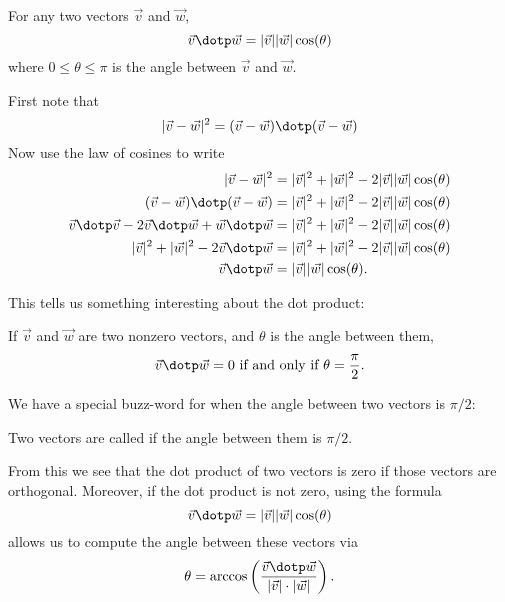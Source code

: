 \documentclass{ximera}
\begin{document}
\begin{theorem}
  For any two vectors $\vec{v}$ and $\vec{w}$,
  \[
  \vec{v} \dotp \vec{w} = |\vec{v}||\vec{w}|\cos(\theta)
  \]
  where $0\le \theta\le\pi$ is the angle between $\vec{v}$ and
  $\vec{w}$.
  \begin{explanation}
    First note that
    \[
    |\vec{v} - \vec{w}|^2 =  (\vec{v} - \vec{w})\dotp(\vec{v} - \vec{w})
    \]
    Now use the law of cosines to write
    \begin{align*}
      |\vec{v} - \vec{w}|^2&=|\vec{v}|^2+|\vec{w}|^2-2|\vec{v}||\vec{w}|\cos(\theta)\\
      (\vec{v} - \vec{w})\dotp(\vec{v} - \vec{w}) &=|\vec{v}|^2+|\vec{w}|^2-2|\vec{v}||\vec{w}|\cos(\theta)\\
      \vec{v}\dotp\vec{v} -2\vec{v}\dotp\vec{w}+\vec{w}\dotp\vec{w}&=|\vec{v}|^2+|\vec{w}|^2-2|\vec{v}||\vec{w}|\cos(\theta)\\
      |\vec{v}|^2+|\vec{w}|^2 -2\vec{v}\dotp\vec{w} &=|\vec{v}|^2+|\vec{w}|^2-2|\vec{v}||\vec{w}|\cos(\theta)\\
      \vec{v} \dotp \vec{w} &= |\vec{v}||\vec{w}|\cos(\theta).
    \end{align*}
  \end{explanation}
\end{theorem}
	
This tells us something interesting about the dot product:

\begin{theorem}
  If $\vec{v}$ and $\vec{w}$ are two nonzero vectors, and $\theta$ is
  the angle between them,
  \[
  \vec{v}\dotp \vec{w} = 0 \text{ if and only if } \theta=
  \frac{\pi}{2}.
  \]
\end{theorem}

We have a special buzz-word for when the angle between two vectors is $\pi/2$:

\begin{definition}
  Two vectors are called  if the angle between them is
  $\pi/2$.
\end{definition}

From this we see that the dot product of two vectors is zero if those
vectors are orthogonal.  Moreover, if the dot product is not zero,
using the formula
\[
\vec{v} \dotp \vec{w} = |\vec{v}||\vec{w}|\cos(\theta)
\]
allows us to compute the angle between these vectors via
\[
\theta = \arccos\left(\frac{\vec{v} \dotp \vec{w} }{|\vec{v}|\cdot|\vec{w}|}\right).
\]
\end{document}
